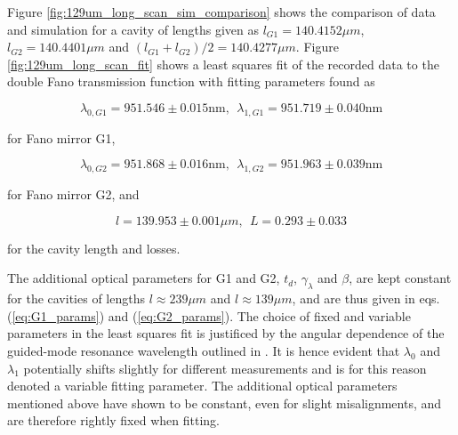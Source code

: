 \newpage
Figure \ref{fig:129um_long_scan_sim_comparison} shows the comparison of data and simulation for a cavity of lengths given as $l_{G1} = 140.4152 \mu m$, $l_{G2} = 140.4401 \mu m$ and $(l_{G1} + l_{G2})/2 = 140.4277 \mu m$. Figure \ref{fig:129um_long_scan_fit} shows a least squares fit of the recorded data to the double Fano transmission function with fitting parameters found as 

\begin{equation}
    \lambda_{0,G1} = 951.546 \pm 0.015 \text{nm}, \:\: \lambda_{1,G1} = 951.719 \pm 0.040 \text{nm}
\end{equation}

for Fano mirror G1,

\begin{equation}
    \lambda_{0,G2} = 951.868 \pm 0.016 \text{nm}, \:\: \lambda_{1,G2} = 951.963 \pm 0.039 \text{nm}
\end{equation}

for Fano mirror G2, and

\begin{equation}
    l = 139.953 \pm 0.001 \mu m, \:\: L = 0.293 \pm 0.033
\end{equation}

for the cavity length and losses.

The additional optical parameters for G1 and G2, $t_d$, $\gamma_{\lambda}$ and $\beta$, are kept constant for the cavities of lengths $l\approx 239 \mu m$ and $l \approx 139 \mu m$, and are thus given in eqs. (\ref{eq:G1_params}) and (\ref{eq:G2_params}). The choice of fixed and variable parameters in the least squares fit is justificed by the angular dependence of the guided-mode resonance wavelength outlined in \cite{Parthenopoulos}. It is hence evident that $\lambda_0$ and $\lambda_1$ potentially shifts slightly for different measurements and is for this reason denoted a variable fitting parameter. The additional optical parameters mentioned above have shown to be constant, even for slight misalignments, and are therefore rightly fixed when fitting. 

